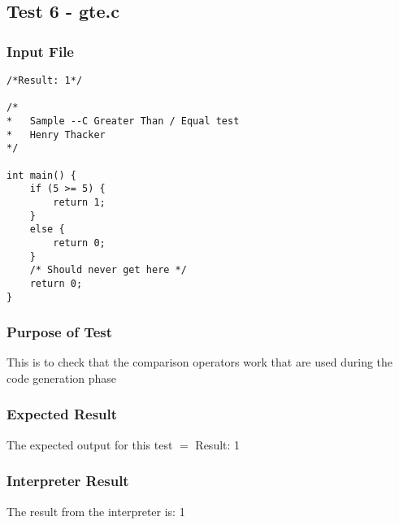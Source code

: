 \subsection{Test 6 - gte.c}
\subsubsection{Input File}
\begin{lstlisting}[showstringspaces=false,breaklines=true,backgroundcolor=\color{light-gray}, captionpos=b]
/*Result: 1*/

/*
*	Sample --C Greater Than / Equal test
*	Henry Thacker
*/

int main() {
	if (5 >= 5) {
		return 1;
	}
	else {
		return 0;
	}
	/* Should never get here */
	return 0;
}
\end{lstlisting}\subsubsection{Purpose of Test}
This is to check that the comparison operators work that are used during the code generation phase

\subsubsection{Expected Result}
The expected output for this test $=$ Result: 1
\subsubsection{Interpreter Result}
The result from the interpreter is: 1
